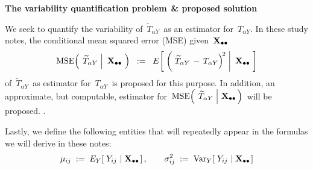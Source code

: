 \begin{center}
\begin{minipage}{5.5in}
\begin{tcolorbox}[arc=8px, colback=white, colframe=black]
\begin{center}
\textbf{The variability quantification problem$\overset{{\color{white}1}}{\textnormal{\color{white}.}}$\& proposed solution}
\end{center}
We seek to quantify the variability of
\,$\widetilde{T}_{\alpha Y}$\,
as an estimator for
\,$T_{\alpha Y}$.
\vskip 0.1cm
In these study notes,
the conditional mean squared error (MSE) given \,$\mathbf{X}_{\bullet\bullet}$\,
\begin{equation*}
\textnormal{MSE}\!\left(\;
    \left.
    \widetilde{T}_{\alpha Y}
    \;\right\vert\!
    \begin{array}{c} \mathbf{X}_{\bullet\bullet} \end{array}
    \!\right)
\;\; := \;\;
    E\!\left[\;\left(\,
        \left.
        \widetilde{T}_{\alpha Y}
        \, - \,
        T_{\alpha Y}
        \right)^{\!2}
        \;\right\vert\!
        \begin{array}{c} \mathbf{X}_{\bullet\bullet} \end{array}
        \!\right]
\end{equation*}
of
\,$\widetilde{T}_{\alpha Y}$\,
as estimator for
\,$T_{\alpha Y}$\,
is proposed for this purpose.
\vskip 0.3cm
\noindent
In addition, an approximate, but computable, estimator for
\,$
\textnormal{MSE}\!\left(\;
    \left.
    \widetilde{T}_{\alpha Y}
    \;\right\vert\!\!
    \begin{array}{c} \mathbf{X}_{\bullet\bullet} \end{array}
    \!\!\right)
$\,
will be proposed.
\vskip -0.25cm
{\color{white}.}
\end{tcolorbox}
\end{minipage}
\end{center}
\vskip 0.3cm
\noindent
Lastly, we define the following entities that will repeatedly appear
in the formulas we will derive in these notes:
\begin{equation*}
\mu_{ij}
\; := \;
    E_{Y}\!\left[\;Y_{ij}\,\left\vert\;\mathbf{X}_{\bullet\bullet}\right.\right],
\quad\quad
\sigma_{ij}^{2}
\; := \;
    \textnormal{Var}_{Y}\!\left[\;
        Y_{ij}
        \,\left\vert\;
        \mathbf{X}_{\bullet\bullet}
        \right.
        \right]
\end{equation*}
